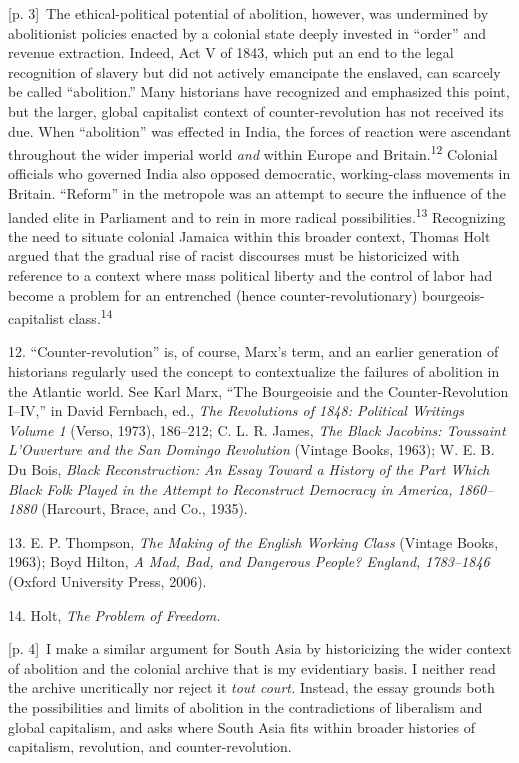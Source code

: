 \documentclass[10pt,a4paper]{article}
\begin{document}
{\scriptsize\color{gray} [p. 3]}\ The ethical-political potential of abolition, however, was undermined by abolitionist policies enacted by a colonial state deeply invested in “order” and revenue extraction. Indeed, Act V of 1843, which put an end to the legal recognition of slavery but did not actively emancipate the enslaved, can scarcely be called “abolition.” Many historians have recognized and emphasized this point, but the larger, global capitalist context of counter-revolution has not received its due. When “abolition” was effected in India, the forces of reaction were ascendant throughout the wider imperial world \textit{and} within Europe and Britain.\nobreak\textsuperscript{12} Colonial officials who governed India also opposed democratic, working-class movements in Britain. “Reform” in the metropole was an attempt to secure the influence of the landed elite in Parliament and to rein in more radical possibilities.\nobreak\textsuperscript{13} Recognizing the need to situate colonial Jamaica within this broader context, Thomas Holt argued that the gradual rise of racist discourses must be historicized with reference to a context where mass political liberty and the control of labor had become a problem for an entrenched (hence counter-revolutionary) bourgeois-capitalist class.\nobreak\textsuperscript{14}\par{\small 12. “Counter-revolution” is, of course, Marx’s term, and an earlier generation of historians regularly used the concept to contextualize the failures of abolition in the Atlantic world. See Karl Marx, “The Bourgeoisie and the Counter-Revolution I–IV,” in David Fernbach, ed., \textit{The Revolutions of 1848: Political Writings Volume 1} (Verso, 1973), 186–212; C. L. R. James, \textit{The Black Jacobins: Toussaint L’Ouverture and the San Domingo Revolution} (Vintage Books, 1963); W. E. B. Du Bois, \textit{Black Reconstruction: An Essay Toward a History of the Part Which Black Folk Played in the Attempt to Reconstruct Democracy in America, 1860–1880} (Harcourt, Brace, and Co., 1935).\par}{\small 13. E. P. Thompson, \textit{The Making of the English Working Class} (Vintage Books, 1963); Boyd Hilton, \textit{A Mad, Bad, and Dangerous People? England, 1783–1846} (Oxford University Press, 2006).\par}{\small 14. Holt, \textit{The Problem of Freedom.}\par}
{\scriptsize\color{gray} [p. 4]}\ I make a similar argument for South Asia by historicizing the wider context of abolition and the colonial archive that is my evidentiary basis. I neither read the archive uncritically nor reject it \textit{tout court.} Instead, the essay grounds both the possibilities and limits of abolition in the contradictions of liberalism and global capitalism, and asks where South Asia fits within broader histories of capitalism, revolution, and counter-revolution.\par
\end{document}
